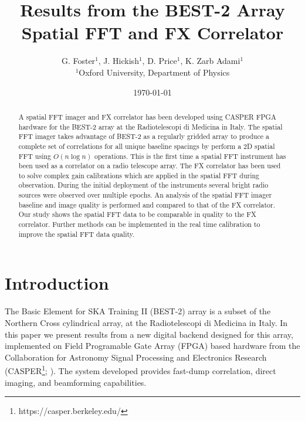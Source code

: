 \documentclass[useAMS,macros,usenatbib]{mn2e}
\title[]{Results from the BEST-2 Array Spatial FFT and FX Correlator}
\author[G. Foster, J. Hickish, D. Price and K. Zarb Adami]{G. Foster$^{1}$, J. Hickish$^{1}$, D. Price$^{1}$, K. Zarb Adami$^{1}$\\
$^{1}$Oxford University, Department of Physics}
\begin{document}
\date{\today}

\pagerange{\pageref{firstpage}--\pageref{lastpage}} 

\maketitle

\begin{abstract}
A spatial FFT imager and FX correlator has been developed using CASPER FPGA hardware for the BEST-2 array at the Radiotelescopi di Medicina in Italy.
The spatial FFT imager takes advantage of BEST-2 as a regularly gridded array to produce a complete set of correlations for all unique baseline spacings by perform a 2D spatial FFT using $O(n \log n)$ operations.
This is the first time a spatial FFT instrument has been used as a correlator on a radio telescope array.
The FX correlator has been used to solve complex gain calibrations which are applied in the spatial FFT during observation.
During the initial deployment of the instruments several bright radio sources were observed over multiple epochs.
An analysis of the spatial FFT imager baseline and image quality is performed and compared to that of the FX correlator.
Our study shows the spatial FFT data to be comparable in quality to the FX correlator.
Further methods can be implemented in the real time calibration to improve the spatial FFT data quality.
\end{abstract}

\section{Introduction}

The Basic Element for SKA Training II (BEST-2) array is a subset of the Northern Cross cylindrical array, at the Radiotelescopi di Medicina in Italy.
In this paper we present results from a new digital backend designed for this array, implemented on Field Programable Gate Array (FPGA) based hardware from the Collaboration for Astronomy Signal Processing and Electronics Research (CASPER\footnote{https://casper.berkeley.edu/}; \cite{casper}).
The system developed provides fast-dump correlation, direct imaging, and beamforming capabilities.
\end{document}
